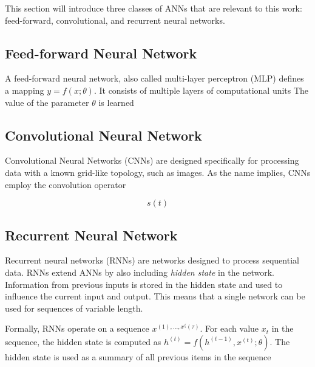 
This section will introduce three classes of ANNs that are relevant to this work:
feed-forward, convolutional, and recurrent neural networks.

\subsection{Feed-forward Neural Network}

A feed-forward neural network, also called multi-layer perceptron (MLP) defines a mapping \(y = f(x; \theta)\).
It consists of multiple layers of computational units
The value of the parameter \(\theta\) is learned  

\cite{goodfellow_deep_2016}

\subsection{Convolutional Neural Network}

Convolutional Neural Networks (CNNs) are designed specifically for processing data with a known grid-like topology, such as images.
As the name implies, CNNs employ the convolution operator

\[
    s(t) 
\]

\cite{goodfellow_deep_2016}


\subsection{Recurrent Neural Network}

Recurrent neural networks (RNNs) are networks designed to process sequential data.
RNNs extend ANNs by also including \textit{hidden state} in the network.
Information from previous inputs is stored in the hidden state and used to influence the current input and output.
This means that a single network can be used for sequences of variable length.

Formally, RNNs operate on a sequence \(x^{(1), \dots, x^\{(\tau)}\).
For each value \(x_t\) in the sequence, the hidden state is computed as \(h^{(t)} = f(h^{(t-1)}, x^{(t)}; \theta)\).
The hidden state is used as a summary of all previous items in the sequence 

